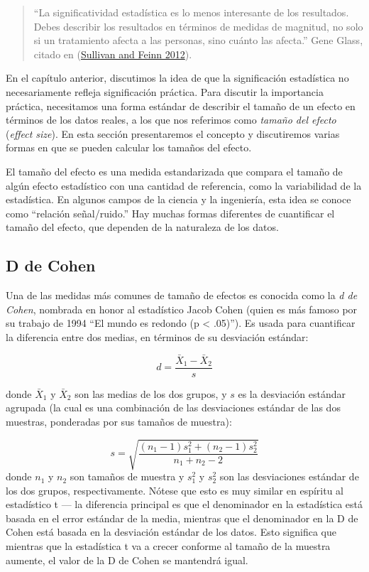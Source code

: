\documentclass[
  12pt,
]{book}
\begin{document}
\begin{quote}
``La significatividad estadística es lo menos interesante de los resultados. Debes describir los resultados en términos de medidas de magnitud, no solo si un tratamiento afecta a las personas, sino cuánto las afecta.'' Gene Glass, citado en (\protect\hyperlink{ref-Sullivan:2012ta}{Sullivan and Feinn 2012}).
\end{quote}

En el capítulo anterior, discutimos la idea de que la significación estadística no necesariamente refleja significación práctica. Para discutir la importancia práctica, necesitamos una forma estándar de describir el tamaño de un efecto en términos de los datos reales, a los que nos referimos como \emph{tamaño del efecto} (\emph{effect size}). En esta sección presentaremos el concepto y discutiremos varias formas en que se pueden calcular los tamaños del efecto.

El tamaño del efecto es una medida estandarizada que compara el tamaño de algún efecto estadístico con una cantidad de referencia, como la variabilidad de la estadística. En algunos campos de la ciencia y la ingeniería, esta idea se conoce como ``relación señal/ruido.'' Hay muchas formas diferentes de cuantificar el tamaño del efecto, que dependen de la naturaleza de los datos.

\hypertarget{d-de-cohen}{%
\subsection{D de Cohen}\label{d-de-cohen}}

Una de las medidas más comunes de tamaño de efectos es conocida como la \emph{d de Cohen}, nombrada en honor al estadístico Jacob Cohen (quien es más famoso por su trabajo de 1994 ``El mundo es redondo (p \textless{} .05)''). Es usada para cuantificar la diferencia entre dos medias, en términos de su desviación estándar:

\[
d = \frac{\bar{X}_1 - \bar{X}_2}{s}
\]

donde \(\bar{X}_1\) y \(\bar{X}_2\) son las medias de los dos grupos, y \(s\) es la desviación estándar agrupada (la cual es una combinación de las desviaciones estándar de las dos muestras, ponderadas por sus tamaños de muestra):

\[
s = \sqrt{\frac{(n_1 - 1)s^2_1 + (n_2 - 1)s^2_2 }{n_1 +n_2 -2}}
\]
donde \(n_1\) y \(n_2\) son tamaños de muestra y \(s^2_1\) y \(s^2_2\) son las desviaciones estándar de los dos grupos, respectivamente. Nótese que esto es muy similar en espíritu al estadístico t --- la diferencia principal es que el denominador en la estadística está basada en el error estándar de la media, mientras que el denominador en la D de Cohen está basada en la desviación estándar de los datos. Esto significa que mientras que la estadística t va a crecer conforme al tamaño de la muestra aumente, el valor de la D de Cohen se mantendrá igual.
\end{document}
